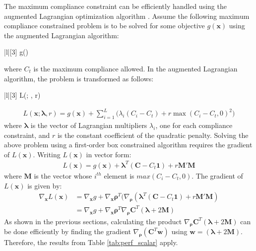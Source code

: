   The maximum compliance constraint can be efficiently handled using the augmented Lagrangian optimization algorithm \citep{Bertsekas1996}. Assume the following maximum compliance constrained problem is to be solved for some objective $g(\bm{x})$ using the augmented Lagrangian algorithm:
  \begin{mini!}|l|[3]
    {}{g()}{}{}
  \end{mini!}
  where $C_t$ is the maximum compliance allowed. In the augmented Lagrangian algorithm, the problem is transformed as follows:
  \begin{mini!}|l|[3]
    {}{L(; \bm{\lambda}, r)}{}{}
  \end{mini!}
  \begin{align}
    L(\bm{x}; \bm{\lambda}, r) = g(\bm{x}) + \sum_{i=1}^{L} \biggl( \lambda_i (C_i - C_t) + r \max(C_i - C_t, 0)^2 \biggr)
  \end{align}
  where $\bm{\lambda}$ is the vector of Lagrangian multipliers $\lambda_i$, one for each compliance constraint, and $r$ is the constant coefficient of the quadratic penalty. Solving the above problem using a first-order box constrained algorithm requires the gradient of $L(\bm{x})$. Writing $L(\bm{x})$ in vector form:
  \begin{align}
    L(\bm{x}) = g(\bm{x}) + \bm{\lambda}^T (\bm{C} - C_t \bm{1}) + r \bm{M}' \bm{M}
  \end{align}
  where $\bm{M}$ is the vector whose $i^{th}$ element is $max(C_i - C_t, 0)$. The gradient of $L(\bm{x})$ is given by:
  \begin{align}
    \nabla_{\bm{x}} L(\bm{x}) & = \nabla_{\bm{x}} g + \nabla_{\bm{x}} \bm{\rho}^T (\nabla_{\bm{\rho}} (\bm{\lambda}^T (\bm{C} - C_t \bm{1}) + r \bm{M}' \bm{M}) \\
    & = \nabla_{\bm{x}} g + \nabla_{\bm{x}} \bm{\rho}^T \nabla_{\bm{\rho}} \bm{C}^T (\bm{\lambda} + 2 \bm{M})
  \end{align}
  As shown in the previous sections, calculating the product $\nabla_{\bm{\rho}} \bm{C}^T (\bm{\lambda} + 2 \bm{M})$ can be done efficiently by finding the gradient $\nabla_{\bm{\rho}} (\bm{C}^T \bm{w})$ using $\bm{w} = (\bm{\lambda} + 2 \bm{M})$. Therefore, the results from Table \ref{tab:perf_scalar} apply.

